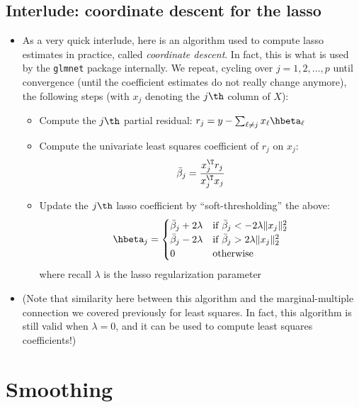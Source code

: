 \documentclass{article}
\begin{document}
\subsection{Interlude: coordinate descent for the lasso}

\begin{itemize}
\item As a very quick interlude, here is an algorithm used to compute lasso
  estimates in practice, called \emph{coordinate descent}. In fact, this is what
  is used by the \verb|glmnet| package internally. We repeat, cycling over 
  $j=1,2,\dots,p$ until convergence (until the coefficient estimates do not
  really change anymore), the following steps (with $x_j$ denoting the $j\th$
  column of $X$): 

\begin{itemize}
\item Compute the $j\th$ partial residual: $r_j = y - \sum_{\ell \not= j} x_\ell 
  \hbeta_\ell$  

\item Compute the univariate least squares coefficient of $r_j$ on $x_j$: 
  \[
  \bar\beta_j = \frac{x_j^\T r_j}{x_j^\T x_j}
  \]

\item Update the $j\th$ lasso coefficient by ``soft-thresholding'' the above: 
  \[
  \hbeta_j = \begin{cases}
  \bar\beta_j + 2\lambda & \text{if $\bar\beta_j < -2\lambda \|x_j\|_2^2$} \\  
  \bar\beta_j - 2\lambda & \text{if $\bar\beta_j > 2\lambda \|x_j\|_2^2$} \\ 
  0 & \text{otherwise}
  \end{cases}
  \]
  where recall $\lambda$ is the lasso regularization parameter 
\end{itemize}

\item (Note that similarity here between this algorithm and the
  marginal-multiple connection we covered previously for least squares. In 
  fact, this algorithm is still valid when $\lambda = 0$, and it can be used to 
  compute least squares coefficients!) 
\end{itemize}

\section{Smoothing}
\end{document}
